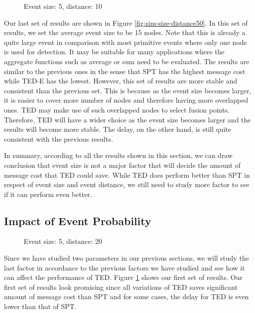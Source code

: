 \begin{figure}
\centering
{}
\caption{Event size: 5, distance: 10}
\label{fig:sim-prob-size5-dist10}
\end{figure}

Our last set of results are shown in Figure \ref{fig:sim-size-distance50}. In this set of results, we set the average event size to be 15 nodes. Note that this is already a quite large event in comparison with most primitive events where only one node is used for detection. It may be suitable for many applications where the aggregate functions such as average or sum need to be evaluated. The results are similar to the previous ones in the sense that SPT has the highest message cost while TED-E has the lowest. However, this set of results are more stable and consistent than the previous set. This is because as the event size becomes larger, it is easier to cover more number of nodes and therefore having more overlapped ones. TED may make use of such overlapped nodes to select fusion points. Therefore, TED will have a wider choice as the event size becomes larger and the results will become more stable. The delay, on the other hand, is still quite consistent with the previous results.

In summary, according to all the results shown in this section, we can draw conclusion that event size is not a major factor that will decide the amount of message cost that TED could save. While TED does perform better than SPT in respect of event size and event distance, we still need to study more factor to see if it can perform even better.

\subsection{Impact of Event Probability}

\begin{figure}
\centering
{}
\caption{Event size: 5, distance: 20}
\label{fig:sim-prob-size5-dist20}
\end{figure}

Since we have studied two parameters in our previous sections, we will study the last factor in accordance to the previous factors we have studied and see how it can affect the performance of TED. Figure \ref{fig:sim-prob-size5-dist10} shows our first set of results. Our first set of results look promising since all variations of TED saves significant amount of message cost than SPT and for some cases, the delay for TED is even lower than that of SPT.

